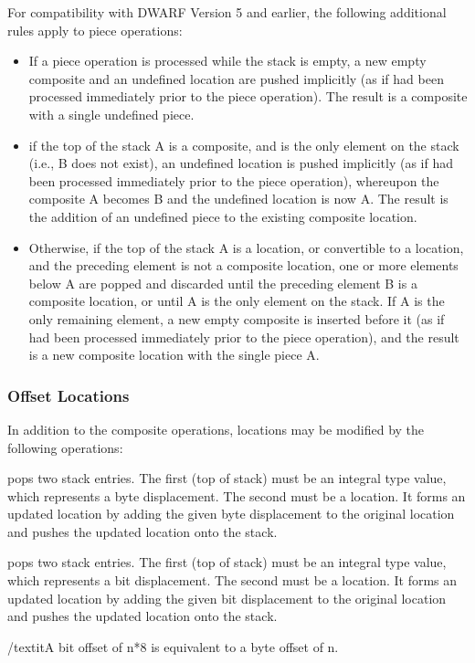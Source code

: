 For compatibility with DWARF Version 5 and earlier, the following
additional rules apply to piece operations:

\begin{itemize}
\item If a piece operation is processed while the stack is empty, a
new empty composite and an undefined location are pushed implicitly
(as if \DWOPcompositeNAME{} \DWOPundefinedNAME{} had been processed
immediately prior to the piece operation). The result is a composite
with a single undefined piece.

\item if the top of the stack A is a composite, and is the only
element on the stack (i.e., B does not exist), an undefined location
is pushed implicitly (as if\DWOPundefinedNAME{} had been processed
immediately prior to the piece operation), whereupon the composite A
becomes B and the undefined location is now A. The result is the
addition of an undefined piece to the existing composite location.

\item Otherwise, if the top of the stack A is a location, or
convertible to a location, and the preceding element is not a
composite location, one or more elements below A are popped and
discarded until the preceding element B is a composite location, or
until A is the only element on the stack. If A is the only remaining
element, a new empty composite is inserted before it (as if
\DWOPcompositeNAME{} \DWOPswapNAME{} had been processed immediately
prior to the piece operation), and the result is a new composite
location with the single piece A.
\end{itemize}

\subsubsection{Offset Locations}
\label{chap:offsetlocations}
In addition to the composite operations, locations may be modified by the following operations:

\begin{enumerate}[1. ]
\itembfnl{\DWOPoffsetTARG}
\DWOPoffsetNAME pops two stack entries. The first (top of stack) must
be an integral type value, which represents a byte displacement. The
second must be a location. It forms an updated location by adding the
given byte displacement to the original location and pushes the
updated location onto the stack.

\itembfnl{\DWOPbitoffsetTARG}
\DWOPbitoffsetNAME pops two stack entries. The first (top of stack)
must be an integral type value, which represents a bit
displacement. The second must be a location. It forms an updated
location by adding the given bit displacement to the original location
and pushes the updated location onto the stack.

/textit{A bit offset of n*8 is equivalent to a byte offset of n.}
\end{enumerate}

